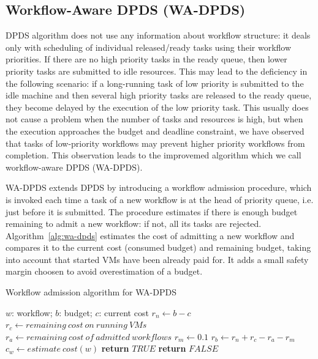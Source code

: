 \documentclass{sig-alternate}
\begin{document}
\subsection{Workflow-Aware DPDS (WA-DPDS)}

DPDS algorithm does not use any information about workflow structure: it deals
only with scheduling of individual released/ready tasks using their
workflow priorities. If there are no high priority tasks in the ready queue,
then lower priority tasks are submitted to idle resources. This may lead to the
deficiency in the following scenario: if a long-running task of low
priority is submitted to the idle machine and then several high
priority tasks are released to the ready queue, they become delayed by the
execution of the low priority task. This usually does not cause a problem when
the number of tasks and resources is high, but when the execution approaches the
budget and deadline constraint, we have observed that tasks of low-priority
workflows may prevent higher priority workflows from completion. This
observation leads to the improvemed algorithm which we call workflow-aware DPDS
(WA-DPDS).

WA-DPDS extends DPDS by introducing a workflow admission procedure, which is
invoked each time a task of a new workflow is at the head of priority queue,
i.e. just before it is submitted. The procedure estimates if there is enough
budget remaining to admit a new workflow: if not, all its tasks are rejected.
Algorithm~\ref{alg:wa-dpds} estimates the cost of admitting a new workflow and
compares it to the current cost (consumed budget) and remaining budget, taking
into account that started VMs have been already paid for. It adds a small safety
margin choosen to avoid overestimation of a budget.

\begin{algorithm}
\caption{Workflow admission algorithm for WA-DPDS}
\label{alg:wa-dpds}
\begin{algorithmic}[1]
\Require $w$: workflow; $b$: budget; $c$: current cost
    \State $r_n\gets b-c$ 
    \State $r_c\gets remaining\ cost\ on\ running\ VMs$
    \State $r_a\gets remaining\ cost\ of\ admitted\ workflows$
	\State $r_m\gets 0.1$ 
	\State $r_b\gets r_n+r_c-r_a-r_m$ 
	\State $c_w\gets estimate\ cost(w)$
    	\State \textbf{return} $TRUE$
    \Else
    	\State \textbf{return} $FALSE$
	\EndIf    	 
\EndProcedure
\end{algorithmic} 
\end{algorithm}
\end{document}

